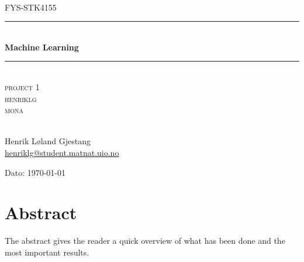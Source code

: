 \documentclass[norsk, a4paper]{report}
\begin{document}
\begin{titlepage}
\begin{center}

\textsc{}\\[1.0cm]
\textsc{\Large FYS-STK4155}\\[0.5cm]
\rule{\linewidth}{0.5mm} \\[0.4cm]
{ \huge \bfseries Machine Learning}\\[0.10cm]
\rule{\linewidth}{0.5mm} \\[1.5cm]
\textsc{\Large project 1}\\
\bigbreak
\textsc{\Large henriklg}\\
\textsc{\Large mona}\\
\textsc{}\\[7.0cm]

\begin{minipage}{0.69\textwidth}
    \begin{center} \large
        Henrik Løland Gjestang\\ \url{henriklg@student.matnat.uio.no} \\
    \end{center}
\end{minipage}

\vfill

\large{Dato: \today}

\end{center}
\end{titlepage}

\section{Abstract}
The abstract gives the reader a quick overview of what has been done and the most important results.

\tableofcontents
\newpage


\end{document}
